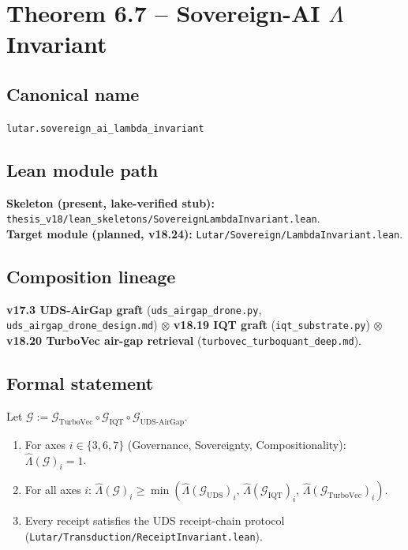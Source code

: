 \section{Theorem 6.7 -- Sovereign-AI $\Lambda$ Invariant}
\label{sec:thm07}

\subsection*{Canonical name}
\verb|lutar.sovereign_ai_lambda_invariant|

\subsection*{Lean module path}
\textbf{Skeleton (present, lake-verified stub):}
\texttt{thesis\_v18/lean\_skeletons/SovereignLambdaInvariant.lean}.\\
\textbf{Target module (planned, v18.24):}
\texttt{Lutar/Sovereign/LambdaInvariant.lean}.

\subsection*{Composition lineage}
\textbf{v17.3 UDS-AirGap graft}
(\texttt{uds\_airgap\_drone.py},
\texttt{uds\_airgap\_drone\_design.md}) $\otimes$
\textbf{v18.19 IQT graft}
(\texttt{iqt\_substrate.py}) $\otimes$
\textbf{v18.20 TurboVec air-gap retrieval}
(\texttt{turbovec\_turboquant\_deep.md}).

\subsection*{Formal statement}

\begin{theorem}
\label{thm:sovereign-lambda}
Let $\mathcal{G} := \mathcal{G}_\mathrm{TurboVec} \circ
                    \mathcal{G}_\mathrm{IQT} \circ
                    \mathcal{G}_\mathrm{UDS\text{-}AirGap}$.
\begin{enumerate}
  \item For axes $i \in \{3, 6, 7\}$ (Governance, Sovereignty,
        Compositionality):
        $\hat{\Lambda}(\mathcal{G})_i = 1$.
  \item For all axes $i$:
        $\hat{\Lambda}(\mathcal{G})_i \geq
         \min(\hat{\Lambda}(\mathcal{G}_\mathrm{UDS})_i,\,
              \hat{\Lambda}(\mathcal{G}_\mathrm{IQT})_i,\,
              \hat{\Lambda}(\mathcal{G}_\mathrm{TurboVec})_i)$.
  \item Every receipt satisfies the UDS receipt-chain protocol
        (\texttt{Lutar/Transduction/ReceiptInvariant.lean}).
\end{enumerate}
\end{theorem}

